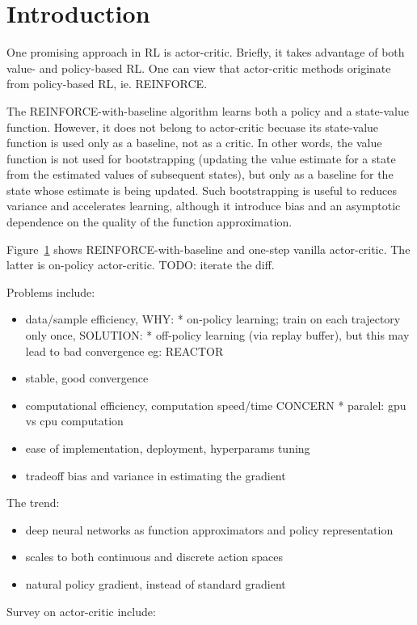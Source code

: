 \section{Introduction}

One promising approach in RL is actor-critic.
Briefly, it takes advantage of both value- and policy-based RL.
One can view that actor-critic methods originate from policy-based RL, ie. REINFORCE.

The REINFORCE-with-baseline algorithm learns both a policy and a state-value function.
However, it does not belong to actor-critic becuase
its state-value function is used only as a baseline, not as a critic.
In other words, the value function is not used for bootstrapping
(updating the value estimate for a state from the estimated values of subsequent states),
but only as a baseline for the state whose estimate is being updated.
Such bootstrapping is useful to reduces variance and accelerates learning,
although it introduce bias and an asymptotic dependence on
the quality of the function approximation.

Figure~\ref{} shows REINFORCE-with-baseline and one-step vanilla actor-critic.
The latter is on-policy actor-critic.
TODO: iterate the diff.

Problems include:
\begin{itemize}
\item data/sample efficiency,
    WHY:
    * on-policy learning; train on each trajectory only once,
    SOLUTION:
    * off-policy learning (via replay buffer),
      but this may lead to bad convergence
      eg: REACTOR~\cite{Gruslys2018}
\item stable, good convergence
\item computational efficiency, computation speed/time
    CONCERN
    * paralel: gpu vs cpu computation

\item ease of implementation, deployment, hyperparams tuning
\item tradeoff bias and variance in estimating the gradient
\end{itemize}

The trend:
\begin{itemize}
\item deep neural networks as
      function approximators and policy representation
\item scales to both continuous and discrete action spaces
\item natural policy gradient, instead of standard gradient
\end{itemize}

Survey on actor-critic include:
\cite{6392457}


